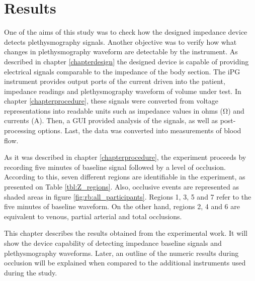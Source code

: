 
\chapter{Results}  %
\label{chapterresults}

\ifpdf
\graphicspath{{Chapter5/Figs/Raster/}{Chapter5/Figs/PDF/}{Chapter5/Figs/}}
\else
\graphicspath{{Chapter5/Figs/Vector/}{Chapter5/Figs/}}
\fi

One of the aims of this study was to check how the designed impedance device detects plethysmography signals. Another objective was to verify how what changes in plethysmography waveform are detectable by the instrument. As described in chapter \ref{chapterdesign} the designed device is capable of providing electrical signals comparable to the impedance of the body section. The iPG instrument provides output ports of the current driven into the patient, impedance readings and plethysmography waveform of volume under test. In chapter \ref{chapterprocedure}, these signals were converted from voltage representations into readable units such as impedance values in ohms (\si{\ohm}) and currents (\si{\ampere}). Then, a GUI provided analysis of the signals, as well as post-processing options. Last, the data was converted into measurements of blood flow.

As it was described in chapter \ref{chapterprocedure}, the experiment proceeds by recording five minutes of baseline signal followed by a level of occlusion. According to this, seven different regions are identifiable in the experiment, as presented on Table \ref{tbl:Z_regions}. Also, occlusive events are represented as shaded areas in figure \ref{fig:rb:all_participants}. Regions 1, 3, 5 and 7 refer to the five minutes of baseline waveform. On the other hand, regions 2, 4 and 6 are equivalent to venous, partial arterial and total occlusions.

This chapter describes the results obtained from the experimental work. It will show the device capability of detecting impedance baseline signals and plethysmography waveforms. Later, an outline of the numeric results during occlusion will be explained when compared to the additional instruments used during the study. 

